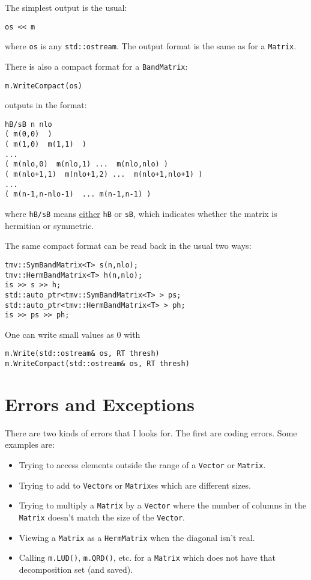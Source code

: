 \documentclass[twoside,letterpaper,11pt]{article}
\renewcommand{\tt}[1]{{\texttt {#1}}}
\begin{document}
The simplest output is the usual:
\begin{verbatim}
os << m
\end{verbatim}
where \tt{os} is any \tt{std::ostream}.
The output format is the same as for a \tt{Matrix}.

There is also a compact format for a \tt{BandMatrix}:
\begin{verbatim}
m.WriteCompact(os)
\end{verbatim}
outputs in the format:
\begin{verbatim}
hB/sB n nlo
( m(0,0)  )
( m(1,0)  m(1,1)  )
...
( m(nlo,0)  m(nlo,1) ...  m(nlo,nlo) )
( m(nlo+1,1)  m(nlo+1,2) ...  m(nlo+1,nlo+1) )
...
( m(n-1,n-nlo-1)  ... m(n-1,n-1) )
\end{verbatim}
where \tt{hB/sB} means \underline{either} \tt{hB} or \tt{sB}, 
which indicates whether the matrix is hermitian or symmetric.

The same compact format can be read back in the usual two ways:
\begin{verbatim}
tmv::SymBandMatrix<T> s(n,nlo);
tmv::HermBandMatrix<T> h(n,nlo);
is >> s >> h;
std::auto_ptr<tmv::SymBandMatrix<T> > ps;
std::auto_ptr<tmv::HermBandMatrix<T> > ph;
is >> ps >> ph;
\end{verbatim}

One can write small values as 0 with
\begin{verbatim}
m.Write(std::ostream& os, RT thresh)
m.WriteCompact(std::ostream& os, RT thresh)
\end{verbatim}

\newpage
\section{Errors and Exceptions}

There are two kinds of errors that I looks for.  The first are 
coding errors.  Some examples are:
\begin{itemize}
\item
Trying to access elements outside the range of a \tt{Vector} or \tt{Matrix}.
\item
Trying to add to \tt{Vector}s or \tt{Matrix}es which are different sizes.
\item
Trying to multiply a \tt{Matrix} by a \tt{Vector} where the number of columns 
in the \tt{Matrix} doesn't match the size of the \tt{Vector}.
\item
Viewing a \tt{Matrix} as a \tt{HermMatrix} when the diagonal isn't real.
\item
Calling \tt{m.LUD()}, \tt{m.QRD()}, etc. for a \tt{Matrix} which does not have that 
decomposition set (and saved).
\end{itemize}
\end{document}
